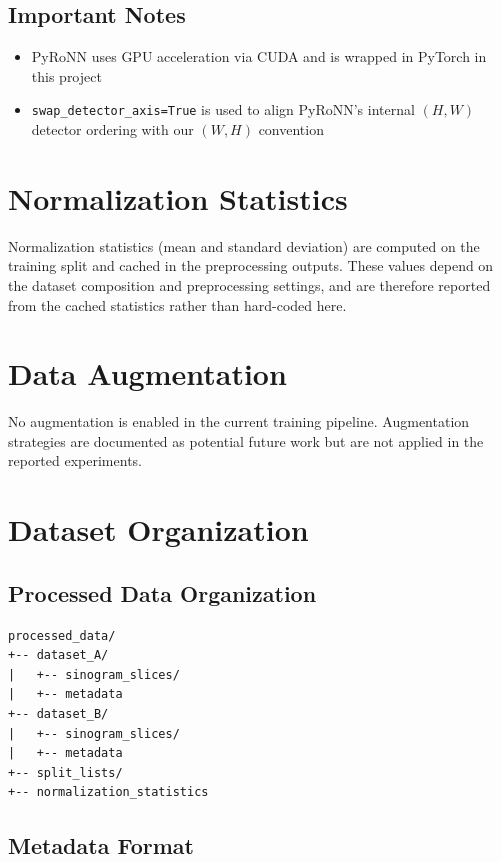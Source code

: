 \subsection{Important Notes}

\begin{itemize}
    \item PyRoNN uses GPU acceleration via CUDA and is wrapped in PyTorch in this project
    \item \texttt{swap\_detector\_axis=True} is used to align PyRoNN's internal $(H, W)$ detector ordering with our $(W, H)$ convention
\end{itemize}

\section{Normalization Statistics}

Normalization statistics (mean and standard deviation) are computed on the training split and cached in the preprocessing outputs. These values depend on the dataset composition and preprocessing settings, and are therefore reported from the cached statistics rather than hard-coded here.

\section{Data Augmentation}

No augmentation is enabled in the current training pipeline. Augmentation strategies are
documented as potential future work but are not applied in the reported experiments.

\section{Dataset Organization}

\subsection{Processed Data Organization}

\begin{verbatim}
processed_data/
+-- dataset_A/
|   +-- sinogram_slices/
|   +-- metadata
+-- dataset_B/
|   +-- sinogram_slices/
|   +-- metadata
+-- split_lists/
+-- normalization_statistics
\end{verbatim}

\subsection{Metadata Format}

